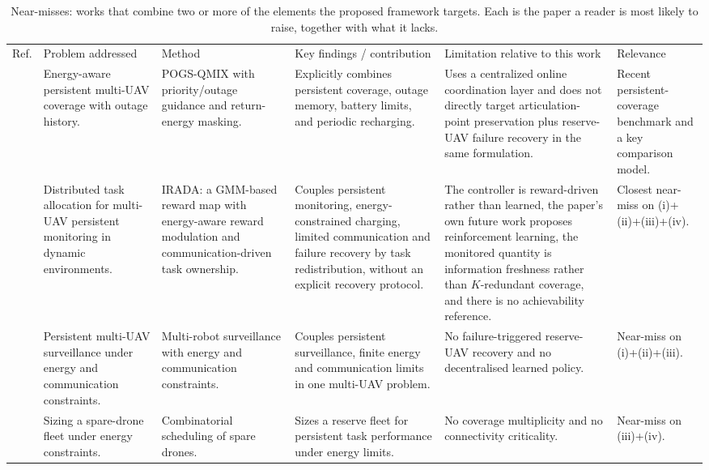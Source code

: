\documentclass[conference]{IEEEtran}
\begin{document}
\begin{table}[t]
\caption{Near-misses: works that combine two or more of the elements the proposed framework targets. Each is the paper a reader is most likely to raise, together with what it lacks.}
\label{tab:nearmiss}
\centering
\scriptsize
\setlength{\tabcolsep}{3pt}
\renewcommand{\arraystretch}{1.08}
\begin{tabularx}{\textwidth}{@{}L{0.5cm}L{2.5cm}L{1.9cm}L{4.6cm}L{4.0cm}Y@{}}
\toprule
Ref. & Problem addressed & Method & Key findings / contribution & Limitation relative to this work & Relevance \\
\cite{mei2026} & Energy-aware persistent multi-UAV coverage with outage history. & POGS-QMIX with priority/outage guidance and return-energy masking. & Explicitly combines persistent coverage, outage memory, battery limits, and periodic recharging. & Uses a centralized online coordination layer and does not directly target articulation-point preservation plus reserve-UAV failure recovery in the same formulation. & Recent persistent-coverage benchmark and a key comparison model. \\
\cite{zhang2025} & Distributed task allocation for multi-UAV persistent monitoring in dynamic environments. & IRADA: a GMM-based reward map with energy-aware reward modulation and communication-driven task ownership. & Couples persistent monitoring, energy-constrained charging, limited communication and failure recovery by task redistribution, without an explicit recovery protocol. & The controller is reward-driven rather than learned, the paper's own future work proposes reinforcement learning, the monitored quantity is information freshness rather than $K$-redundant coverage, and there is no achievability reference. & Closest near-miss on (i)+(ii)+(iii)+(iv). \\
\cite{scherer2016} & Persistent multi-UAV surveillance under energy and communication constraints. & Multi-robot surveillance with energy and communication constraints. & Couples persistent surveillance, finite energy and communication limits in one multi-UAV problem. & No failure-triggered reserve-UAV recovery and no decentralised learned policy. & Near-miss on (i)+(ii)+(iii). \\
\cite{hartuv2018} & Sizing a spare-drone fleet under energy constraints. & Combinatorial scheduling of spare drones. & Sizes a reserve fleet for persistent task performance under energy limits. & No coverage multiplicity and no connectivity criticality. & Near-miss on (iii)+(iv). \\

\end{tabularx}
\end{table}
\end{document}
